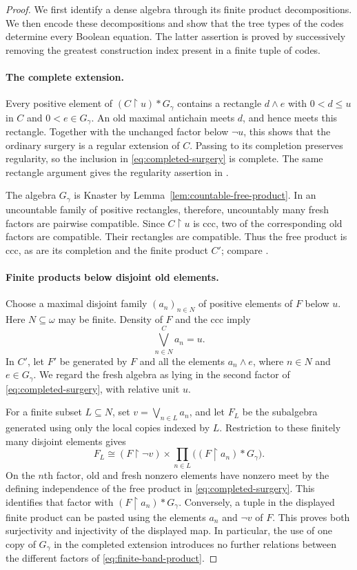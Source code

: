 \documentclass[11pt]{article}
\theoremstyle{definition}
\theoremstyle{remark}
\newcommand{\restr}{\mathbin{\upharpoonright}}
\begin{document}
\begin{proof}
We first identify a dense algebra through its finite product decompositions.
We then encode these decompositions and show that the tree types of the
codes determine every Boolean equation.  The latter assertion is proved by
successively removing the greatest construction index present in a finite
tuple of codes.

\paragraph{The complete extension.}
Every positive element of $(C\restr u)*G_\gamma$ contains a rectangle
$d\wedge e$ with $0<d\leq u$ in $C$ and $0<e\in G_\gamma$.
An old maximal antichain meets $d$, and hence meets this rectangle.  Together
with the unchanged factor below $\neg u$, this shows that the ordinary
surgery is a regular extension of $C$.  Passing to its completion preserves
regularity, so the inclusion in \eqref{eq:completed-surgery} is complete.
The same rectangle argument gives the regularity assertion in
\cite[Claim~2.9(2)]{Shelah2026}.

The algebra $G_\gamma$ is Knaster by
Lemma~\ref{lem:countable-free-product}.  In an uncountable family of
positive rectangles, therefore, uncountably many fresh factors are
pairwise compatible.  Since
$C\restr u$ is ccc, two of the corresponding old factors are compatible.
Their rectangles are compatible.  Thus the free product is ccc, as are its
completion and the finite product $C'$; compare
\cite[Claim~2.9(1)]{Shelah2026}.

\paragraph{Finite products below disjoint old elements.}
Choose a maximal disjoint family $(a_n)_{n\in N}$ of positive elements of
$F$ below $u$.  Here $N\subseteq\omega$ may be finite.  Density of $F$ and
the ccc imply
\[
 \bigvee_{n\in N}^{C}a_n=u.
\]
In $C'$, let $F'$ be generated by $F$ and all the elements $a_n\wedge e$,
where $n\in N$ and $e\in G_\gamma$.  We regard the fresh algebra as lying
in the second factor of \eqref{eq:completed-surgery}, with relative unit
$u$.

For a finite subset $L\subseteq N$, set $v=\bigvee_{n\in L}a_n$, and let
$F_L$ be the subalgebra generated using only the local copies indexed by
$L$.  Restriction to these finitely many disjoint elements gives
\begin{equation}\label{eq:finite-band-product}
 F_L\cong
 (F\restr\neg v)\times
 \prod_{n\in L}\bigl((F\restr a_n)*G_\gamma\bigr).
\end{equation}
On the $n$th factor, old and fresh nonzero elements have nonzero meet by
the defining independence of the free product in
\eqref{eq:completed-surgery}.  This identifies that factor with
$(F\restr a_n)*G_\gamma$.  Conversely, a tuple in the displayed finite
product can be pasted using the elements $a_n$ and $\neg v$ of $F$.
This proves both surjectivity and injectivity of the displayed map.
In particular, the use of one copy of $G_\gamma$ in the completed
extension introduces no further relations between the different factors of
\eqref{eq:finite-band-product}.


\end{proof}
\end{document}
